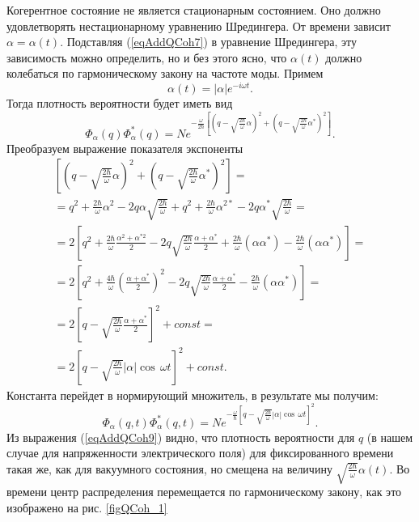 Когерентное состояние не является стационарным состоянием. Оно должно
удовлетворять нестационарному уравнению Шредингера. От времени зависит
$\alpha = \alpha\left(t\right)$. Подставляя (\ref{eqAddQCoh7}) в
уравнение Шредингера, эту зависимость можно определить, но и без этого
ясно, что $\alpha\left(t\right)$ должно колебаться по гармоническому
закону на частоте моды. Примем 
\[
\alpha\left(t\right) = \left|\alpha\right| e^{-i \omega t}.
\]
Тогда плотность вероятности будет иметь вид
\begin{equation}
\Phi_{\alpha}\left(q\right)\Phi_{\alpha}^{*}\left(q\right) = N e^{-\frac{\omega}{2
    \hbar}
\left[\left(q-\sqrt{\frac{2\hbar}{\omega}}\alpha\right)^2
+
\left(q-\sqrt{\frac{2\hbar}{\omega}}\alpha^{*}\right)^2
\right]
}.
\nonumber
\end{equation}
Преобразуем выражение показателя экспоненты
\begin{eqnarray}
\left[\left(q-\sqrt{\frac{2\hbar}{\omega}}\alpha\right)^2
+
\left(q-\sqrt{\frac{2\hbar}{\omega}}\alpha^{*}\right)^2
\right] = 
\nonumber \\
=
q^2 + \frac{2\hbar}{\omega}\alpha^2 - 2 q \alpha
  \sqrt{\frac{2\hbar}{\omega}} +
q^2 + \frac{2\hbar}{\omega}\alpha^{2 *} - 2 q \alpha^{*}
  \sqrt{\frac{2\hbar}{\omega}} =
\nonumber \\
= 2
\left[
q^2 + \frac{2\hbar}{\omega}\frac{\alpha^2 + \alpha^{*2}}{2} -
2 q \sqrt{\frac{2\hbar}{\omega}} \frac{\alpha + \alpha^{*}}{2} +
\frac{2 \hbar}{\omega}\left(\alpha\alpha^{*}\right) -
\frac{2 \hbar}{\omega}\left(\alpha\alpha^{*}\right)
\right] = 
\nonumber \\
= 2
\left[
q^2 + \frac{4\hbar}{\omega}\left(\frac{\alpha + \alpha^{*}}{2}\right)^2 -
2 q \sqrt{\frac{2\hbar}{\omega}} \frac{\alpha + \alpha^{*}}{2}  -
\frac{2 \hbar}{\omega}\left(\alpha\alpha^{*}\right)
\right] = 
\nonumber \\
= 2
\left[
q - \sqrt{\frac{2\hbar}{\omega}} \frac{\alpha + \alpha^{*}}{2}
\right]^2 + const = 
\nonumber \\
= 
2
\left[
q - \sqrt{\frac{2\hbar}{\omega}} \left|\alpha\right|\cos\,\omega t
\right]^2 + const.
\nonumber
\end{eqnarray}
Константа перейдет в нормирующий множитель, в результате мы получим:
\begin{equation}
\Phi_{\alpha}\left(q,t\right)\Phi_{\alpha}^{*}\left(q,t\right) = N
e^{-\frac{\omega}{\hbar}
\left[
q - \sqrt{\frac{2\hbar}{\omega}} \left|\alpha\right|\cos\,\omega t
\right]^2
}.
\label{eqAddQCoh9}
\end{equation}
Из выражения (\ref{eqAddQCoh9}) видно, что плотность вероятности для
$q$ (в нашем случае для напряженности электрического поля) для
фиксированного времени такая же, как для вакуумного состояния, но
смещена на величину
$\sqrt{\frac{2\hbar}{\omega}}\alpha\left(t\right)$. Во времени центр
распределения перемещается по гармоническому закону, как это
изображено на рис. \ref{figQCoh_1} 

